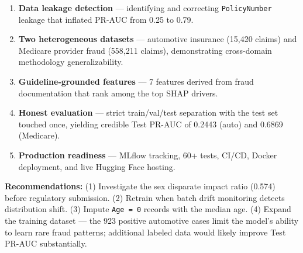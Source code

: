 \documentclass[10pt,twocolumn]{article}
\begin{document}
\begin{enumerate}[leftmargin=*, itemsep=1pt]
    \item \textbf{Data leakage detection} --- identifying and correcting \texttt{PolicyNumber} leakage that inflated PR-AUC from 0.25 to 0.79.
    \item \textbf{Two heterogeneous datasets} --- automotive insurance (15,420 claims) and Medicare provider fraud (558,211 claims), demonstrating cross-domain methodology generalizability.
    \item \textbf{Guideline-grounded features} --- 7 features derived from fraud documentation that rank among the top SHAP drivers.
    \item \textbf{Honest evaluation} --- strict train/val/test separation with the test set touched once, yielding credible Test PR-AUC of 0.2443 (auto) and 0.6869 (Medicare).
    \item \textbf{Production readiness} --- MLflow tracking, 60+ tests, CI/CD, Docker deployment, and live Hugging Face hosting.
\end{enumerate}

\textbf{Recommendations:} (1) Investigate the sex disparate impact ratio (0.574) before regulatory submission. (2) Retrain when batch drift monitoring detects distribution shift. (3) Impute \texttt{Age = 0} records with the median age. (4) Expand the training dataset --- the 923 positive automotive cases limit the model's ability to learn rare fraud patterns; additional labeled data would likely improve Test PR-AUC substantially.
\end{document}
